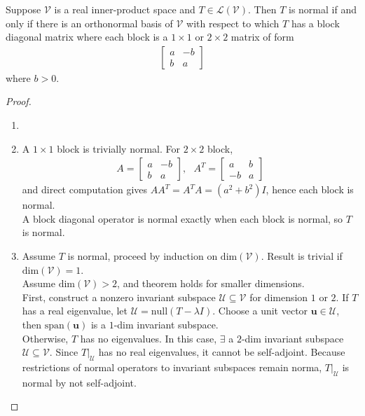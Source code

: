 \begin{theorem} Suppose $\mathcal{V}$ is a real inner-product space and $T \in \mathcal{L}(\mathcal{V})$. Then $T$ is normal if and only if there is an orthonormal basis of $\mathcal{V}$ with respect to which $T$ has a block diagonal matrix where each block is a $1 \times 1$ or $2 \times 2$ matrix of form
\begin{align}
\begin{bmatrix}
a & -b \\
b & a
\end{bmatrix} \nonumber
\end{align}
where $b > 0$.
\begin{proof} 
\begin{enumerate}[label=\roman*.]
\setlength{\itemsep}{0pt}
\item[]
\item[$(\Leftarrow)$] A $1 \times 1$ block is trivially normal. For $2 \times 2$ block,
\begin{align}
A =
\begin{bmatrix}
a & -b \\
b & a
\end{bmatrix}, \ \ \ 
A^T =
\begin{bmatrix}
a & b \\
-b & a
\end{bmatrix} \nonumber
\end{align}
and direct computation gives $AA^T = A^T A = (a^2 + b^2)I$, hence each block is normal.\\
A block diagonal operator is normal exactly when each block is normal, so $T$ is normal.
\item[$(\Rightarrow)$] Assume $T$ is normal, proceed by induction on $\text{dim}(\mathcal{V})$. Result is trivial if $\text{dim}(\mathcal{V}) = 1$.\\
Assume $\text{dim}(\mathcal{V})>2$, and theorem holds for smaller dimensions.\\
First, construct a nonzero invariant subspace $\mathcal{U} \subseteq \mathcal{V}$ for dimension $1$ or $2$. If $T$ has a real eigenvalue, let $\mathcal{U} = \text{null}(T - \lambda I)$. Choose a unit vector $\mathbf{u} \in \mathcal{U}$, then $\text{span}(\mathbf{u})$ is a $1$-dim invariant subspace.\\
Otherwise, $T$ has no eigenvalues. In this case, $\exists$ a $2$-dim invariant subspace $\mathcal{U} \subseteq \mathcal{V}$. Since $T|_{\mathcal{U}}$ has no real eigenvalues, it cannot be self-adjoint. Because restrictions of normal operators to invariant subspaces remain norma, $T|_{\mathcal{U}}$ is normal by not self-adjoint.\\

\end{enumerate}
\end{proof}
\end{theorem}
